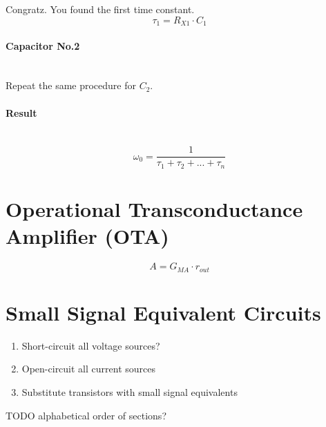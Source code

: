 \documentclass[twocolumn]{article}
\begin{document}
      Congratz. You found the first time constant.
      $$\tau_1 = R_{X1} \cdot C_1$$

    \paragraph{Capacitor No.2} \hfill \\
      Repeat the same procedure for $C_2$.

    \paragraph{Result} \hfill \\
      $$\omega_0 = \frac{1}{\tau_1 + \tau_2 + ... + \tau_n}$$

  \section{Operational Transconductance Amplifier (OTA)}
    $$A = G_{MA} \cdot r_{out}$$

  \section{Small Signal Equivalent Circuits}
    \begin{enumerate}
      \item Short-circuit all voltage sources?
      \item Open-circuit all current sources
      \item Substitute transistors with small signal equivalents
    \end{enumerate}

  TODO alphabetical order of sections?
\end{document}
